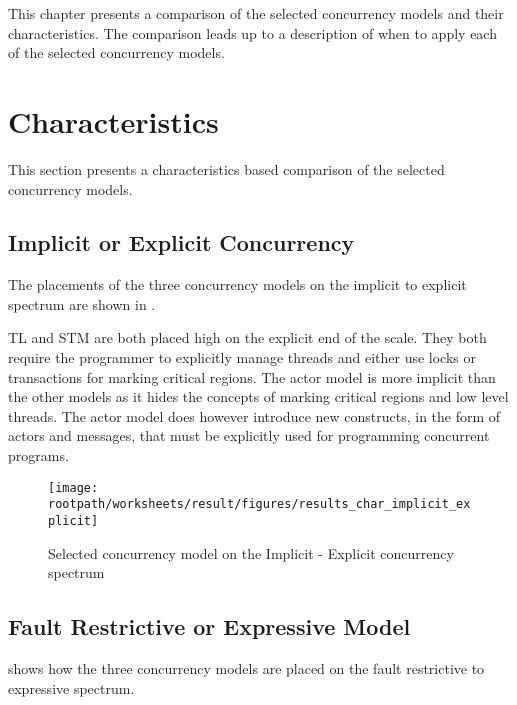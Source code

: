 \makeatletter {}\makeatother
{}
This chapter presents a comparison of the selected concurrency models and their characteristics. The comparison leads up to a description of when to apply each of the selected concurrency models.
\label{chap:results}

\section{Characteristics}
This section presents a characteristics based comparison of the selected concurrency models.

\subsection{Implicit or Explicit Concurrency}
The placements of the three concurrency models on the implicit to explicit spectrum are shown in .

\ac{TL} and \ac{STM} are both placed high on the explicit end of the scale. They both require the programmer to explicitly manage threads and either use locks or transactions for marking critical regions. The actor model is more implicit than the other models as it hides the concepts of marking critical regions and low level threads. The actor model does however introduce new constructs, in the form of actors and messages, that must be explicitly used for programming concurrent programs.

\begin{figure}[htbp]
\centering
 \texttt{[image: \\rootpath/worksheets/result/figures/results\_char\_implicit\_explicit]} 
 \caption{Selected concurrency model on the Implicit - Explicit concurrency spectrum}
\label{fig:results_char_impli_expli}
\end{figure}

\subsection{Fault Restrictive or Expressive Model}
 shows how the three concurrency models are placed on the fault restrictive to expressive spectrum.

